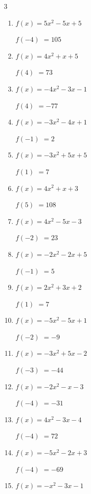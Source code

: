\begin{multicols}{3}
\begin{enumerate}
$f(1)$
        $= -10$

\columnbreak %

\resetques

  \item $f(x)=5x^{2}-5x+5$

$f(-4)$
        $= 105$

  \item $f(x)=4x^{2}+x+5$

$f(4)$
        $= 73$

  \item $f(x)=-4x^{2}-3x-1$

$f(4)$
        $= -77$

  \item $f(x)=-3x^{2}-4x+1$

$f(-1)$
        $= 2$

  \item $f(x)=-3x^{2}+5x+5$

$f(1)$
        $= 7$

  \item $f(x)=4x^{2}+x+3$

$f(5)$
        $= 108$

  \item $f(x)=4x^{2}-5x-3$

$f(-2)$
        $= 23$

  \item $f(x)=-2x^{2}-2x+5$

$f(-1)$
        $= 5$

  \item $f(x)=2x^{2}+3x+2$

$f(1)$
        $= 7$

  \item $f(x)=-5x^{2}-5x+1$

$f(-2)$
        $= -9$

  \item $f(x)=-3x^{2}+5x-2$

$f(-3)$
        $= -44$

  \item $f(x)=-2x^{2}-x-3$

$f(-4)$
        $= -31$

  \item $f(x)=4x^{2}-3x-4$

$f(-4)$
        $= 72$

  \item $f(x)=-5x^{2}-2x+3$

$f(-4)$
        $= -69$

  \item $f(x)=-x^{2}-3x-1$


\end{enumerate}
\end{multicols}

